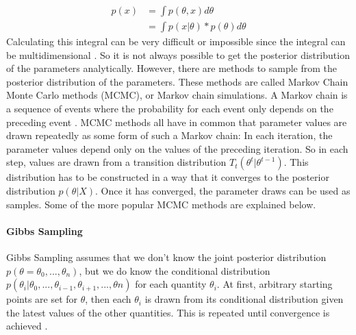 \documentclass{article}
\begin{document}
\begin{equation}
\begin{split}
p(x) &= \int p(\theta,x) d \theta \\
&=  \int p(x|\theta) * p(\theta) d \theta
\end{split}
\end{equation}
Calculating this integral can be very difficult or impossible since the integral can be multidimensional \cite{1439840954}. So it is not always possible to get the posterior distribution of the parameters analytically. However, there are methods to sample from the posterior distribution of the parameters. These methods are called Markov Chain Monte Carlo methods (MCMC), or Markov chain simulations. A Markov chain is a sequence of events where the probability for each event only depends on the preceding event \cite{Oxforddictionaries}. MCMC methods all have in common that parameter values are drawn repeatedly as some form of such a Markov chain: In each iteration, the parameter values depend only on the values of the preceding iteration. So in each step, values are drawn from a transition distribution $T_t(\theta^t|\theta^{t-1})$. This distribution has to be constructed in a way that it converges to the posterior distribution $p(\theta|X)$. Once it has converged, the parameter draws can be used as samples. Some of the more popular MCMC methods are explained below.
\paragraph{Gibbs Sampling}
Gibbs Sampling assumes that we don't know the joint posterior distribution $p(\theta = \theta_0,...,\theta_n)$, but we do know the conditional distribution $p(\theta_i | \theta_0,...,\theta_{i-1},\theta_{i+1},...,\theta{n} )$ for each quantity $\theta_i$. At first, arbitrary starting points are set for $\theta$, then each $\theta_i$ is drawn from its conditional distribution given the latest values of the other quantities. This is repeated until convergence is achieved
\cite{Martz1994}.
\end{document}
